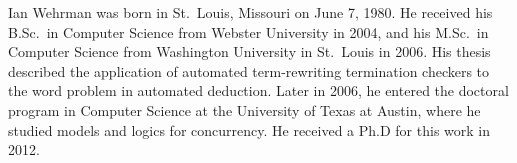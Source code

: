 \documentclass[11pt]{report}         %
\begin{document}

 

\begin{thesisauthorvita}
    Ian Wehrman was born in St.\ Louis, Missouri on June 7, 1980. He received his B.Sc.\ in Computer Science from Webster University in 2004, and his M.Sc.\ in Computer Science from Washington University in St.\ Louis in 2006. His thesis described the application of automated term-rewriting termination checkers to the word problem in automated deduction. Later in 2006, he entered the doctoral program in Computer Science at the University of Texas at Austin, where he studied models and logics for concurrency. He received a Ph.D for this work in 2012.
\end{thesisauthorvita}
\end{document}
